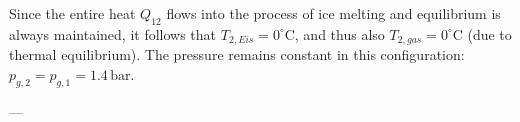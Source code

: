 Since the entire heat \( Q_{12} \) flows into the process of ice melting and equilibrium is always maintained, it follows that \( T_{2,Eis} = 0^\circ \text{C} \), and thus also \( T_{2,gas} = 0^\circ \text{C} \) (due to thermal equilibrium). The pressure remains constant in this configuration:  
\( p_{g,2} = p_{g,1} = 1.4 \, \text{bar} \).

---